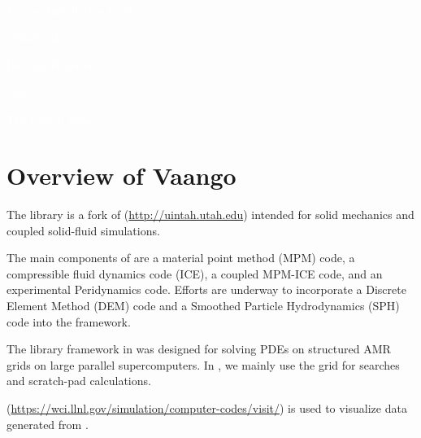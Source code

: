 \documentclass[11pt,fleqn]{book} %
\begin{document}
  \begingroup
    \thispagestyle{empty}
    \AddToShipoutPicture*{\BackgroundPic} %
    \centering
    \vspace*{1cm}
    \par\normalfont\fontsize{35}{35}\sffamily\selectfont
    \textcolor{white}{Vaango Installation Guide}\par %
    \vspace*{0.5cm}
    {\Large \textcolor{white}{\version}}\par
    {\Large \textcolor{white}{\today}}\par
    \vspace*{1cm}
    {\Large \textcolor{white}{Biswajit Banerjee}}\par %
    {\Large \textcolor{white}{and}}\par %
    {\Large \textcolor{white}{The Uintah team}}\par %
  \endgroup

  

\chapter{Overview of Vaango} \label{sec:overview} 
The \Vaango library is a fork of \Uintah
(\url{http://uintah.utah.edu}) intended for solid mechanics and
coupled solid-fluid simulations.  

The main components of \Vaango
are a material point method (MPM) code, a compressible fluid dynamics
code (ICE), a coupled MPM-ICE code, and an experimental Peridynamics
code.  Efforts are underway to incorporate a Discrete Element Method (DEM)
code and a Smoothed Particle Hydrodynamics (SPH) code into the framework.

The library framework in \Uintah was designed for solving PDEs on 
structured AMR grids on large parallel supercomputers.  In \Vaango, we
mainly use the grid for searches and scratch-pad calculations.

\Visit (\url{https://wci.llnl.gov/simulation/computer-codes/visit/})
is used to visualize data generated from \Vaango.
\end{document}
